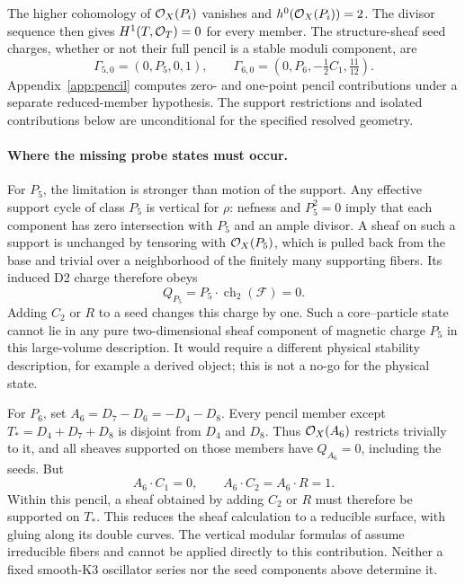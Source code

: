 The higher cohomology of $\mathcal O_X(P_i)$ vanishes and
$h^0(\mathcal O_X(P_i))=2$. The divisor sequence then gives
$H^1(T,\mathcal O_T)=0$ for every member. The structure-sheaf seed
charges, whether or not their full pencil is a stable moduli
component, are
\begin{equation}
 \Gamma_{5,0}=(0,P_5,0,1),\qquad
 \Gamma_{6,0}=(0,P_6,-\tfrac12C_1,\tfrac{11}{12}).
 \label{eq:x9-moving-seed-charges}
\end{equation}
Appendix~\ref{app:pencil} computes zero- and one-point pencil
contributions under a separate reduced-member hypothesis.
The support restrictions and isolated contributions below are
unconditional for the specified resolved geometry.

\paragraph{Where the missing probe states must occur.}
For $P_5$, the limitation is stronger than motion of the support.
Any effective support cycle of class $P_5$ is vertical for $\rho$:
nefness and $P_5^2=0$ imply that each component has zero intersection
with $P_5$ and an ample divisor. A sheaf on such a support is unchanged
by tensoring with $\mathcal O_X(P_5)$, which is pulled back from the base and
trivial over a neighborhood of the finitely many supporting fibers.
Its induced D2 charge therefore obeys
\begin{equation}
 Q_{P_5}=P_5\cdot\operatorname{ch}_2(\mathcal F)=0.
 \label{eq:x9-vertical-charge-selection}
\end{equation}
Adding $C_2$ or $R$ to a seed changes this charge by one. Such a
core--particle state cannot lie in any pure two-dimensional sheaf
component of magnetic charge $P_5$ in this large-volume description.
It would require a different physical stability description, for
example a derived object; this is not a no-go for the physical state.

For $P_6$, set $A_6=D_7-D_6=-D_4-D_8$. Every pencil member except
$T_*=D_4+D_7+D_8$ is disjoint from $D_4$ and $D_8$.
Thus $\mathcal O_X(A_6)$ restricts trivially to it, and all sheaves supported
on those members have $Q_{A_6}=0$, including the seeds. But
\begin{equation}
 A_6\cdot C_1=0,\qquad A_6\cdot C_2=A_6\cdot R=1.
 \label{eq:x9-reducible-probe-selection}
\end{equation}
Within this pencil, a sheaf obtained by adding $C_2$ or $R$ must
therefore be supported on $T_*$. This reduces the sheaf calculation
to a reducible surface, with gluing along its double curves. The vertical modular formulas of
\cite{Bouchard:2017Vertical} assume irreducible fibers and cannot be
applied directly to this contribution. Neither a fixed smooth-K3
oscillator series nor the seed components above determine it.


